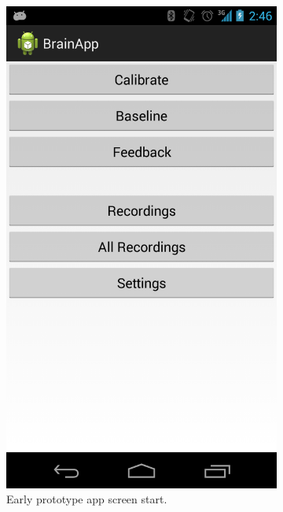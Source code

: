 \documentclass[a4paper,10pt,english,lof,lot,twoside]{puthesis}
\begin{document}
\begin{figure}
\centering
\capstart
\begin{subfigure}[t]{0.30\linewidth}
\centering
\capstart

\includegraphics[width=0.800\linewidth]{early-prototype-app-screen-start.png}
\caption[Start screen]{Early prototype app screen start.}\label{ch-design/index:fig-early-prototype-app-screen-start}\end{subfigure}
\begin{subfigure}[t]{0.30\linewidth}
\centering
\capstart


\end{subfigure}
\end{figure}
\end{document}
